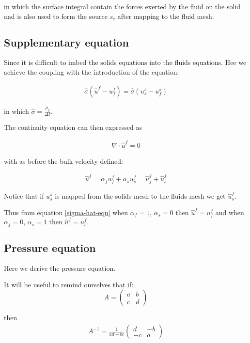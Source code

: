 in which the surface integral contain the forces 
exerted by the fluid on the solid and is also 
used to form the source $s_c$ after mapping to the fluid mesh. 

\subsection{Supplementary equation}
Since it is difficult to imbed the solids equations into 
the fluids equations. Hee we achieve the coupling with the 
introduction of the equation:

\begin{eqnarray}
\hat\sigma (\hat u^f - u_f^f) = \hat\sigma( u_s^s-u_f^s)
\label{sigma-hat-eqn}
\end{eqnarray}

in which $\hat\sigma=\frac{\rho_f}{\Delta t}$. 

The continuity equation can then expressed as 

\begin{eqnarray}
\nabla \cdot \hat u^f=0
\end{eqnarray}

with as before the bulk velocity defined:

\begin{eqnarray}
\hat u^f=\alpha_f u_f^f + \alpha_s u_s^f= \hat u_f^f + \hat u_s^f
\end{eqnarray}

Notice that if $u_s^s$ is mapped from the solids mesh to 
the fluids mesh we get $\hat u_s^f$. 

Thus from equation \ref{sigma-hat-eqn} when $\alpha_f=1$, $\alpha_s=0$ 
then $\hat u^f=u_f^f$ and when $\alpha_f=0$, 
$\alpha_s=1$ then $\hat u^f=u_s^f$.  


\subsection{Pressure equation}
Here we derive the pressure equation. 

It will be useful to remind ourselves that if:
\begin{equation}
A=
\begin{pmatrix}
 a & b \\ c & d
\end{pmatrix} 
\end{equation}

then
\begin{eqnarray}
A^{-1} =\frac{1}{ad-bc}
\begin{pmatrix}
  d & -b \\ -c & a 
\end{pmatrix} 
\end{eqnarray}

